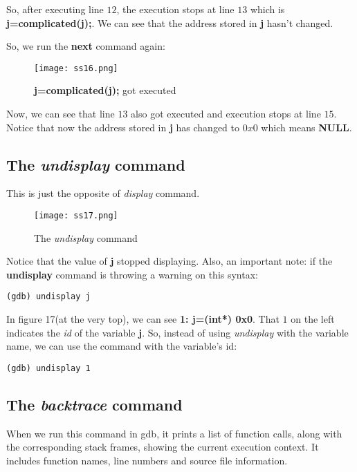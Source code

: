 \documentclass{article}
\makeatletter
\renewcommand\paragraph{\@startsection{paragraph}{4}{\z@}{-3.25ex \@plus -1ex \@minus -.2ex}{1.5ex \@plus .2ex}{\normalfont\normalsize\bfseries}}
\makeatother
\begin{document}
So, after executing line $12$, the execution stops at line $13$ which is \textbf{j=complicated(j);}. We can see that the address stored in \textbf{j} hasn't changed.

So, we run the \textbf{next} command again:
\begin{figure}[h]
\centering
\texttt{[image: ss16.png]}
\caption{\textbf{j=complicated(j);} got executed}
\end{figure}

Now, we can see that line $13$ also got executed and execution stops at line $15$. Notice that now the address stored in \textbf{j} has changed to $0x0$ which means \textbf{NULL}.

\newpage
\subsection{The \textit{undisplay} command}
\paragraph{}
This is just the opposite of \textit{display} command.

\begin{figure}[h]
\centering
\texttt{[image: ss17.png]}
\caption{The \textit{undisplay} command}
\end{figure}

Notice that the value of \textbf{j} stopped displaying. Also, an important note: if the \textbf{undisplay} command is throwing a warning on this syntax:
\begin{Verbatim}[frame=single]
(gdb) undisplay j
\end{Verbatim}

In figure 17(at the very top), we can see \textbf{1: j=(int*) 0x0}. That $1$ on the left indicates the \textit{id} of the variable \textbf{j}. So, instead of using \textit{undisplay} with the variable name, we can use the command with the variable's id:

\begin{Verbatim}[frame=single]
(gdb) undisplay 1
\end{Verbatim}

\newpage
\subsection{The \textit{backtrace} command}
\paragraph{}
When we run this command in gdb, it prints a list of function calls, along with the corresponding stack frames, showing the current execution context. It includes function names, line numbers and source file information.
\end{document}
